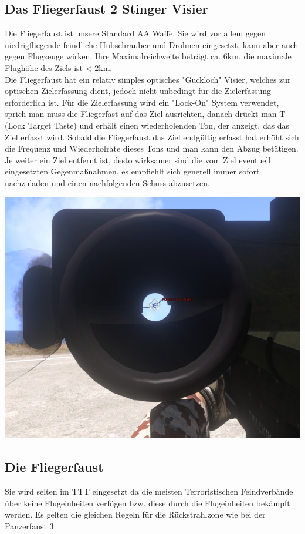 \subsection{Das Fliegerfaust 2 Stinger Visier}
Die Fliegerfaust ist unsere Standard \acf{AA} Waffe. Sie wird vor allem gegen niedrigfliegende feindliche Hubschrauber und Drohnen eingesetzt, kann aber auch gegen Flugzeuge wirken. Ihre Maximalreichweite beträgt ca. 6km, die maximale Flughöhe des Ziels ist < 2km. \\
Die Fliegerfaust hat ein relativ simples optisches "Guckloch" Visier, welches zur optischen Zielerfassung dient, jedoch nicht unbedingt für die Zielerfassung erforderlich ist. Für die Zielerfassung wird ein "Lock-On" System verwendet, sprich man muss die Fliegerfast auf das Ziel ausrichten, danach drückt man T (Lock Target Taste) und erhält einen wiederholenden Ton, der anzeigt, das das Ziel erfasst wird. Sobald die Fliegerfaust das Ziel endgültig erfasst hat erhöht sich die Frequenz und Wiederholrate dieses Tons und man kann den Abzug betätigen. Je weiter ein Ziel entfernt ist, desto wirksamer sind die vom Ziel eventuell eingesetzten Gegenmaßnahmen, es empfiehlt sich generell immer sofort nachzuladen und einen nachfolgenden Schuss abzusetzen. \\
\begin{minipage}[t]{1\textwidth}
\includegraphics[width=\textwidth]{./Grafiken/Abschnitt/Fliegerfaust_Visier.png}
\end{minipage}

\subsection{Die Fliegerfaust}
Sie wird selten im \ac{TTT} eingesetzt da die meisten Terroristischen Feindverbände über keine Flugeinheiten verfügen bzw. diese durch die Flugeinheiten bekämpft werden. Es gelten die gleichen Regeln für die Rückstrahlzone wie bei der Panzerfaust 3.\\

